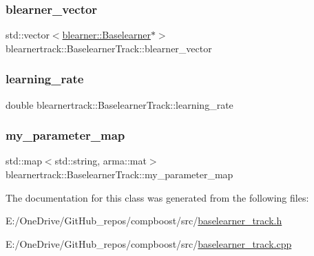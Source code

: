 \subsubsection{\texorpdfstring{blearner\+\_\+vector}{blearner\_vector}}
{\footnotesize\ttfamily std\+::vector$<$\mbox{\hyperlink{classblearner_1_1_baselearner}{blearner\+::\+Baselearner}}$\ast$$>$ blearnertrack\+::\+Baselearner\+Track\+::blearner\+\_\+vector\hspace{0.3cm}{\ttfamily [private]}}

\mbox{\label{classblearnertrack_1_1_baselearner_track_a62d743fe6171c52410e2f5da3dc58ffb}} 
\subsubsection{\texorpdfstring{learning\+\_\+rate}{learning\_rate}}
{\footnotesize\ttfamily double blearnertrack\+::\+Baselearner\+Track\+::learning\+\_\+rate\hspace{0.3cm}{\ttfamily [private]}}

\mbox{\label{classblearnertrack_1_1_baselearner_track_a3725470c87e28ea32d4b184f1e6aad39}} 
\subsubsection{\texorpdfstring{my\+\_\+parameter\+\_\+map}{my\_parameter\_map}}
{\footnotesize\ttfamily std\+::map$<$std\+::string, arma\+::mat$>$ blearnertrack\+::\+Baselearner\+Track\+::my\+\_\+parameter\+\_\+map\hspace{0.3cm}{\ttfamily [private]}}



The documentation for this class was generated from the following files\+:\begin{DoxyCompactItemize}
\item 
E\+:/\+One\+Drive/\+Git\+Hub\+\_\+repos/compboost/src/\mbox{\hyperlink{baselearner__track_8h}{baselearner\+\_\+track.\+h}}\item 
E\+:/\+One\+Drive/\+Git\+Hub\+\_\+repos/compboost/src/\mbox{\hyperlink{baselearner__track_8cpp}{baselearner\+\_\+track.\+cpp}}\end{DoxyCompactItemize}
